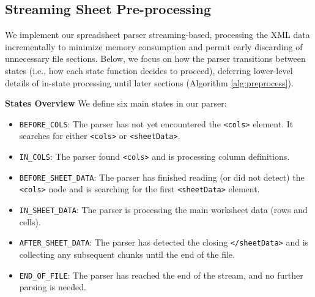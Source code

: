 \documentclass[conference]{IEEEtran}
\begin{document}
\begin{algorithm}

\end{algorithm}



\subsection{Streaming Sheet Pre-processing}



We implement our spreadsheet parser streaming-based, processing the XML data incrementally to minimize memory consumption and permit early discarding of unnecessary file sections. Below, we focus on how the parser transitions between states (i.e., how each state function decides to proceed), deferring lower-level details of in-state processing until later sections (Algorithm \ref{alg:preprocess}).

\textbf{States Overview}
We define six main states in our parser:
\begin{itemize}
  \item \texttt{BEFORE\_COLS}: The parser has not yet encountered the \texttt{<cols>} element. It searches for either \texttt{<cols>} or \texttt{<sheetData>}.
  \item \texttt{IN\_COLS}: The parser found \texttt{<cols>} and is processing column definitions.
  \item \texttt{BEFORE\_SHEET\_DATA}: The parser has finished reading (or did not detect) the \texttt{<cols>} node and is searching for the first \texttt{<sheetData>} element.
  \item \texttt{IN\_SHEET\_DATA}: The parser is processing the main worksheet data (rows and cells).
  \item \texttt{AFTER\_SHEET\_DATA}: The parser has detected the closing \texttt{</sheetData>} and is collecting any subsequent chunks until the end of the file.
  \item \texttt{END\_OF\_FILE}: The parser has reached the end of the stream, and no further parsing is needed.
\end{itemize}
\end{document}
